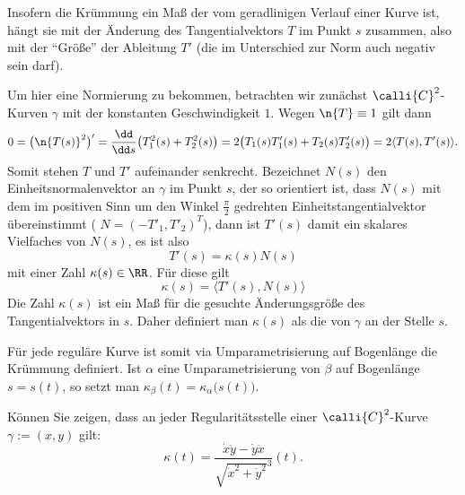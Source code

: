   \begin{antwort}
    Insofern die Krümmung ein Maß der  
    vom geradlinigen Verlauf einer Kurve ist, 
    hängt sie mit der Änderung des Tangentialvektors $T$ 
    im Punkt $s$ zusammen, also mit der "`Größe"' 
    der Ableitung $T'$ (die im Unterschied zur Norm auch negativ sein darf).   

    Um hier eine Normierung zu bekommen, betrachten wir zunächst  
    $\calli{C}^2$-Kurven $\gamma$ mit der konstanten Geschwindigkeit $1$. 
    Wegen $\n{T} \equiv 1$ gilt dann
    \[
    0=\big(\n{ T(s) }^2\big) ' = \frac{\dd}{\dd s}\big( T_1^2(s) + T_2^2 (s) \big) = 
    2 \big( T_1(s) T_1'(s) + T_2(s) T_2'(s) \big)
    = 2 \langle T(s), T'(s) \rangle. 
    \]
    Somit stehen $T$ und $T'$ aufeinander senkrecht. Bezeichnet 
    $N(s)$ den Einheitsnormalenvektor an $\gamma$ im Punkt $s$, der 
    so orientiert ist, dass $N(s)$ mit dem im positiven Sinn um den Winkel 
    $\frac{\pi}{2}$ gedrehten Einheitstangentialvektor übereinstimmt 
    ({\dasheisst} $N=(-T'_1, T'_2)^T$), dann ist 
    $T'(s)$ damit ein skalares Vielfaches von $N(s)$, es ist also  
    \[
    T'(s) = \kappa(s) N(s)  
    \]
    mit einer Zahl $\kappa(s) \in \RR$. Für diese gilt 
    \[
    \boxed{ \kappa(s) = \langle T'(s) , N(s) \rangle }
    \]
    Die Zahl $\kappa(s)$ ist ein Maß für die gesuchte Änderungsgröße 
    des Tangentialvektors in $s$. Daher definiert 
    man $\kappa(s)$ als die  von $\gamma$ an der 
    Stelle $s$.
    
    Für jede reguläre Kurve ist somit via Umparametrisierung auf Bogenlänge 
    die Krümmung definiert. Ist $\alpha$ eine Umparametrisierung von $\beta$ auf 
    Bogenlänge $s=s(t)$, so setzt man 
    $\kappa_\beta(t)=\kappa_\alpha \big( s(t) \big)$. \AntEnd
  \end{antwort} 

  \begin{frage}
    Können Sie zeigen, dass an jeder Regularitätsstelle einer 
    $\calli{C}^2$-Kurve $\gamma:=(x,y)$ gilt: 
    \[
    \boxed{ \kappa(t)=\frac{\dot{x}\ddot{y} - \dot{y}\ddot{x} }{ 
        \sqrt{\dot{x}^2 + \dot{y}^2 }^3 } (t). }
    \] 
  \end{frage}

